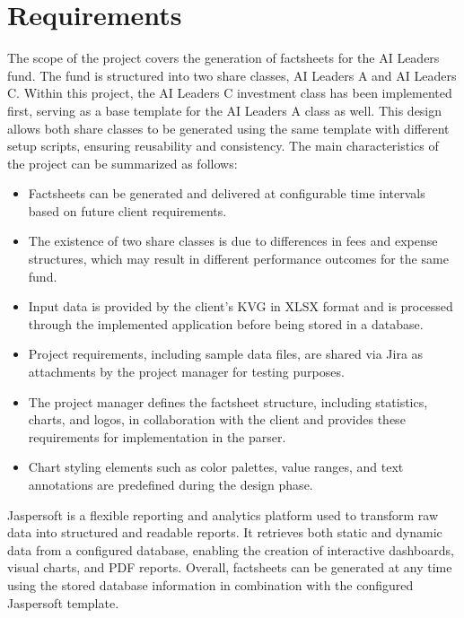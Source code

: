 \section{Requirements}
The scope of the project covers the generation of factsheets for the AI Leaders fund. The fund is structured into two share classes, AI Leaders A and AI Leaders C. 
Within this project, the AI Leaders C investment class has been implemented first, serving as a base template for the AI Leaders A class as well. 
This design allows both share classes to be generated using the same template with different setup scripts, ensuring reusability and consistency. 
The main characteristics of the project can be summarized as follows: 
\begin{itemize} 
    \item Factsheets can be generated and delivered at configurable time intervals based on future client requirements. 
    \item The existence of two share classes is due to differences in fees and expense structures, which may result in different performance outcomes for the same fund. 
    \item Input data is provided by the client’s KVG in XLSX format and is processed through the implemented application before being stored in a database. 
    \item Project requirements, including sample data files, are shared via Jira as attachments by the project manager for testing purposes. 
    \item The project manager defines the factsheet structure, including statistics, charts, and logos, in collaboration with the client and provides these requirements for implementation in the parser. 
    \item Chart styling elements such as color palettes, value ranges, and text annotations are predefined during the design phase. 
\end{itemize} 
Jaspersoft is a flexible reporting and analytics platform used to transform raw data into structured and readable reports. It retrieves both static and dynamic data from a configured database, enabling the creation of interactive dashboards, visual charts, and PDF reports. 
Overall, factsheets can be generated at any time using the stored database information in combination with the configured Jaspersoft template.



